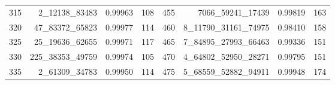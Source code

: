 \documentclass[preprint]{sigplanconf}
\begin{document}
\begin{table}
\begin{center}
\begin{tabular}{|c r c c| c r c c|}
            315             & 2\_12138\_83483   & 0.99963          & 108             & 455          & 7066\_59241\_17439     & 0.99819          & 163             \\
            320             & 47\_83372\_65823  & 0.99977          & 114             & 460          & 8\_11790\_31161\_74975 & 0.98410          & 158             \\
            325             & 25\_19636\_62655  & 0.99971          & 117             & 465          & 7\_84895\_27993\_66463 & 0.99336          & 151             \\
            330             & 225\_38353\_49759 & 0.99974          & 105             & 470          & 4\_64802\_52950\_28271 & 0.99795          & 151             \\
            335             & 2\_61309\_34783   & 0.99950          & 114             & 475          & 5\_68559\_52882\_94911 & 0.99948          & 174             \\
            \hline
        \end{tabular}
        \label{tab-8}
    \end{center}
\end{table}


\end{document}
